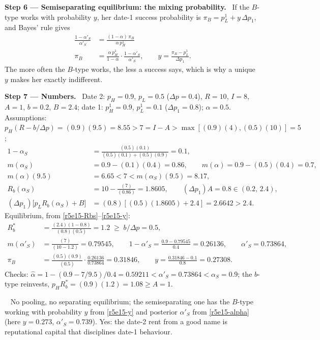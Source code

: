 \documentclass[11pt,a4paper]{article}
\newcommand{\step}[2]{\par\medskip\noindent\textbf{Step #1 --- #2.}~}
\newcommand{\answer}[1]{\par\smallskip\noindent\fbox{\textbf{Answer #1.}}~}
\begin{document}
\step{6}{Semiseparating equilibrium: the mixing probability} If the $B$-type works with probability $y$, her date-1 success probability is $\pi_B=p^1_L+y\,\Delta p_1$, and Bayes' rule gives
\begin{align}
  \frac{1-\alpha'_S}{\alpha'_S} &= \frac{(1-\alpha)\,\pi_B}{\alpha\,p^1_H} \nonumber\\
  \pi_B &= \frac{\alpha\,p^1_H}{1-\alpha}\cdot\frac{1-\alpha'_S}{\alpha'_S}, \qquad y = \frac{\pi_B-p^1_L}{\Delta p_1}. \label{r5e15-y}
\end{align}
The more often the $B$-type works, the less a success says, which is why a unique $y$ makes her exactly indifferent.

\step{7}{Numbers} Date 2: $p_H=0.9$, $p_L=0.5$ ($\Delta p=0.4$), $R=10$, $I=8$, $A=1$, $b=0.2$, $B=2.4$; date 1: $p^1_H=0.9$, $p^1_L=0.1$ ($\Delta p_1=0.8$); $\alpha=0.5$. Assumptions: $p_H(R-b/\Delta p)=(0.9)(9.5)=8.55>7=I-A>\max[(0.9)(4),(0.5)(10)]=5$;
\begin{align}
  1-\alpha_S &= \frac{(0.5)(0.1)}{(0.5)(0.1)+(0.5)(0.9)} = 0.1, \nonumber\\
  m(\alpha_S) &= 0.9-(0.1)(0.4) = 0.86, \qquad m(\alpha) = 0.9-(0.5)(0.4) = 0.7, \nonumber\\
  m(\alpha)(9.5) &= 6.65 < 7 < m(\alpha_S)(9.5) = 8.17, \nonumber\\
  R_b(\alpha_S) &= 10-\frac{(7)}{(0.86)} = 1.8605, \qquad (\Delta p_1)A = 0.8\in(0.2,\,2.4), \nonumber\\
  (\Delta p_1)\bigl[p_LR_b(\alpha_S)+B\bigr] &= (0.8)[(0.5)(1.8605)+2.4] = 2.6642 > 2.4. \nonumber
\end{align}
Equilibrium, from \eqref{r5e15-Rbs}--\eqref{r5e15-y}:
\begin{align}
  R_b^* &= \frac{(2.4)(1-0.8)}{(0.8)(0.5)} = 1.2 \;\ge\; b/\Delta p = 0.5, \nonumber\\
  m(\alpha'_S) &= \frac{(7)}{(10-1.2)} = 0.79545, \qquad 1-\alpha'_S = \frac{0.9-0.79545}{0.4} = 0.26136, \qquad \alpha'_S = 0.73864, \nonumber\\
  \pi_B &= \frac{(0.5)(0.9)}{(0.5)}\cdot\frac{0.26136}{0.73864} = 0.31846, \qquad y = \frac{0.31846-0.1}{0.8} = 0.27308. \nonumber
\end{align}
Checks: $\hat\alpha=1-(0.9-7/9.5)/0.4=0.59211<\alpha'_S=0.73864<\alpha_S=0.9$; the $b$-type reinvests, $p_HR_b^*=(0.9)(1.2)=1.08\ge A=1$.
\answer{(ii)} No pooling, no separating equilibrium; the semiseparating one has the $B$-type working with probability $y$ from \eqref{r5e15-y} and posterior $\alpha'_S$ from \eqref{r5e15-alpha} (here $y=0.273$, $\alpha'_S=0.739$). Yes: the date-2 rent from a good name is reputational capital that disciplines date-1 behaviour.
\end{document}
